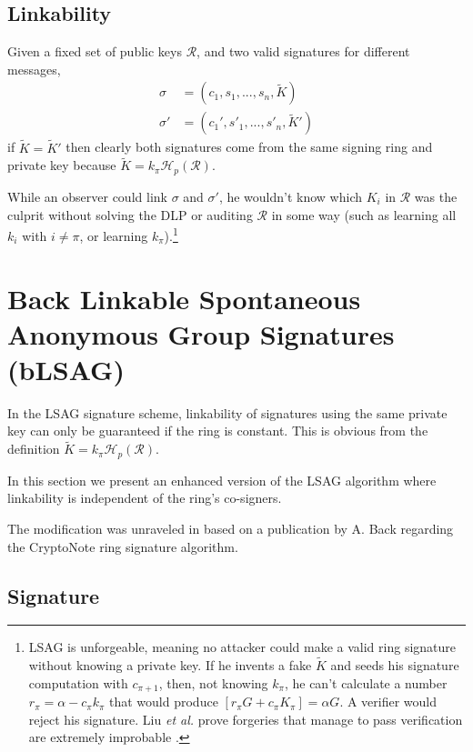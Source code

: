 \subsection*{Linkability}

Given a fixed set of public keys \(\mathcal{R}\), and two valid signatures for different messages, 
\begin{align*}
\sigma   &= (c_1, s_1, ..., s_n, \tilde{K})\\
\sigma'  &= (c_1', s'_1, ..., s'_n, \tilde{K}')
\end{align*}
if \(\tilde{K} =  \tilde{K}'\) then clearly both signatures come from the same signing ring and private key because $\tilde{K}= k_{\pi} \mathcal{H}_p(\mathcal{R})$.

While an observer could link $\sigma$ and $\sigma'$, he wouldn’t know which $K_i$ in $\mathcal{R}$ was the culprit without solving the DLP or auditing $\mathcal{R}$ in some way (such as learning all $k_i$ with $i \neq \pi$, or learning $k_\pi$).\footnote{\label{lsag_unforgeable_note}LSAG is unforgeable, meaning no attacker could make a valid ring signature without knowing a private key. If he invents a fake $\tilde{K}$ and seeds his signature computation with $c_{\pi+1}$, then, not knowing $k_\pi$, he can’t calculate a number $r_\pi = \alpha - c_\pi k_\pi$ that would produce $[r_\pi G + c_\pi K_\pi] = \alpha G$. A verifier would reject his signature. Liu {\em et al.} prove forgeries that manage to pass verification are extremely improbable \cite{Liu2004}.}



\section{Back Linkable Spontaneous Anonymous Group Signatures (bLSAG)}
\label{blsag_note}

In the LSAG signature scheme, linkability of signatures using the same private key can only be guaranteed if the ring is constant. This is obvious from the definition \(\tilde{K} = k_\pi \mathcal{H}_p(\mathcal{R})\).

In this section we present an enhanced version of the LSAG algorithm where linkability is independent of the ring’s co-signers.

The modification was unraveled in \cite{cryptoeprint:2015:1098} based on a publication by A. Back \cite{AdamBack-ring-efficiency} regarding the CryptoNote \cite{cryptoNoteWhitePaper} ring signature algorithm.


\subsection*{Signature}


